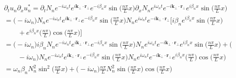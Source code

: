 \documentclass[english]{article}
\begin{document}
 {}
\begin{align*}
 & \partial_{t}u_{n}\partial_{x}u^{*}_{n}=\partial_{t}N_{n}e^{-i\omega_{n}t}e^{i\boldsymbol{k}_{\bot}\cdot\boldsymbol{r}_{\bot}}e^{-i\beta_{n}x}\sin\biggl(\frac{n\pi}{L}x\biggr)\partial_{x}N_{n}e^{i\omega_{n}t}e^{-i\boldsymbol{k}_{\bot}\cdot\boldsymbol{r}_{\bot}}e^{i\beta_{n}x}\sin\biggl(\frac{n\pi}{L}x\biggr)\\
 & =\biggl(-i\omega_{n}\biggr)N_{n}e^{-i\omega_{n}t}e^{i\boldsymbol{k}_{\bot}\cdot\boldsymbol{r}_{\bot}}e^{-i\beta_{n}x}\sin\biggl(\frac{n\pi}{L}x\biggr)N_{n}e^{i\omega_{n}t}e^{-i\boldsymbol{k}_{\bot}\cdot\boldsymbol{r}_{\bot}}\biggl[i\beta_{n}e^{i\beta_{n}x}\sin\biggl(\frac{n\pi}{L}x\biggr)\\
 & \qquad+e^{i\beta_{n}x}\biggl(\frac{n\pi}{L}\biggr)\cos\biggl(\frac{n\pi}{L}x\biggr)\biggr]\\
 & =\biggl(-i\omega_{n}\biggr)i\beta_{n}N_{n}e^{-i\omega_{n}t}e^{i\boldsymbol{k}_{\bot}\cdot\boldsymbol{r}_{\bot}}e^{-i\beta_{n}x}\sin\biggl(\frac{n\pi}{L}x\biggr)N_{n}e^{i\omega_{n}t}e^{-i\boldsymbol{k}_{\bot}\cdot\boldsymbol{r}_{\bot}}e^{i\beta_{n}x}\sin\biggl(\frac{n\pi}{L}x\biggr)+\biggl(\\
 & \qquad-i\omega_{n}\biggr)N_{n}e^{-i\omega_{n}t}e^{i\boldsymbol{k}_{\bot}\cdot\boldsymbol{r}_{\bot}}e^{-i\beta_{n}x}\sin\biggl(\frac{n\pi}{L}x\biggr)N_{n}e^{i\omega_{n}t}e^{-i\boldsymbol{k}_{\bot}\cdot\boldsymbol{r}_{\bot}}e^{i\beta_{n}x}\biggl(\frac{n\pi}{L}\biggr)\cos\biggl(\frac{n\pi}{L}x\biggr)\\
 & =\omega_{n}\beta_{n}N^{2}_{n}\sin^{2}\biggl(\frac{n\pi}{L}x\biggr)+\biggl(-i\omega_{n}\biggr)\frac{n\pi}{L}N^{2}_{n}\sin\biggl(\frac{n\pi}{L}x\biggr)\cos\biggl(\frac{n\pi}{L}x\biggr)
\end{align*}
 {}
\end{document}
